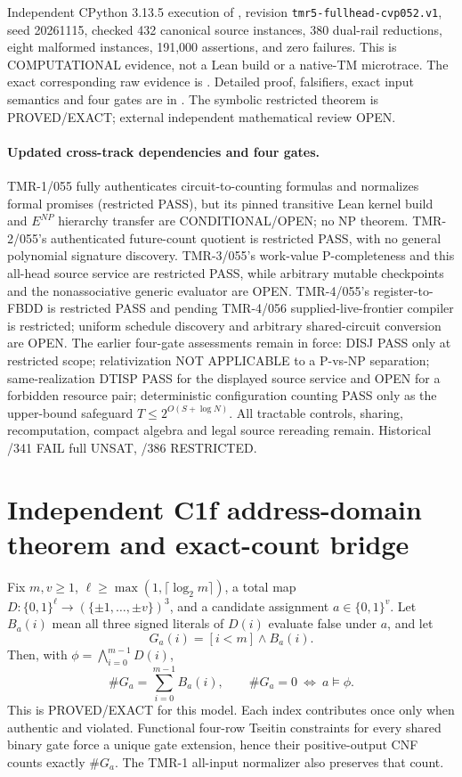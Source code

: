 \documentclass[11pt]{article}
\begin{document}
Independent CPython 3.13.5 execution of
,
revision \texttt{tmr5-fullhead-cvp052.v1}, seed 20261115,
checked 432 canonical source instances, 380 dual-rail
reductions, eight malformed instances, 191{,}000 assertions,
and zero failures. This is COMPUTATIONAL evidence, not
a Lean build or a native-TM microtrace. The exact
corresponding raw evidence is
.
Detailed proof, falsifiers, exact input semantics and
four gates are in
.
The symbolic restricted theorem is PROVED/EXACT;
external independent mathematical review OPEN.

\paragraph{Updated cross-track dependencies and four gates.}
TMR-1/055 fully authenticates circuit-to-counting formulas and
normalizes formal promises (restricted PASS), but its pinned
transitive Lean kernel build and $E^{NP}$ hierarchy transfer are
CONDITIONAL/OPEN; no NP theorem. TMR-2/055's authenticated
future-count quotient is restricted PASS, with no general
polynomial signature discovery. TMR-3/055's work-value
P-completeness and this all-head source service are restricted
PASS, while arbitrary mutable checkpoints and the
nonassociative generic evaluator are OPEN. TMR-4/055's
register-to-FBDD is restricted PASS and pending TMR-4/056
supplied-live-frontier compiler is restricted;
uniform schedule discovery and arbitrary shared-circuit
conversion are OPEN. The earlier four-gate assessments
remain in force: DISJ PASS only at restricted scope;
relativization NOT APPLICABLE to a P-vs-NP separation;
same-realization DTISP PASS for the displayed source
service and OPEN for a forbidden resource pair;
deterministic configuration counting PASS only as the
upper-bound safeguard $T\le2^{O(S+\log N)}$.
All tractable controls, sharing, recomputation,
compact algebra and legal source rereading remain.
Historical /341 FAIL full UNSAT, /386 RESTRICTED.

\section{Independent C1f address-domain theorem and exact-count bridge}
Fix \(m,v\ge1\), \(\ell\ge\max(1,\lceil\log_2m\rceil)\),
a total map \(D:\{0,1\}^{\ell}\to(\{\pm1,\dots,\pm v\})^3\),
and a candidate assignment \(a\in\{0,1\}^v\).
Let \(B_a(i)\) mean all three signed literals of \(D(i)\) evaluate
false under \(a\), and let
\[
 G_a(i)=[i<m]\wedge B_a(i).
\]
Then, with \(\phi=\bigwedge_{i=0}^{m-1}D(i)\),
\[
 \#G_a=\sum_{i=0}^{m-1}B_a(i),
 \qquad \#G_a=0\ \Longleftrightarrow\ a\models\phi.
\]
This is PROVED/EXACT for this model. Each index contributes once
only when authentic and violated. Functional four-row Tseitin constraints
for every shared binary gate force a unique gate extension, hence their
positive-output CNF counts exactly \(\#G_a\).
The TMR-1 all-input normalizer also preserves that count.
\end{document}
